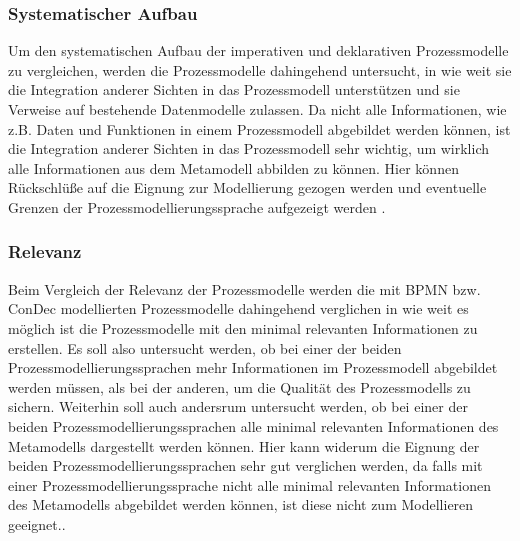 \subsubsection{Systematischer Aufbau}
Um den systematischen Aufbau der imperativen und deklarativen Prozessmodelle zu vergleichen, werden die Prozessmodelle dahingehend untersucht, in wie weit sie die Integration anderer Sichten in das Prozessmodell unterstützen und sie Verweise auf bestehende Datenmodelle zulassen. Da nicht alle Informationen, wie z.B. Daten und Funktionen in einem Prozessmodell abgebildet werden können, ist die Integration anderer Sichten in das Prozessmodell sehr wichtig, um wirklich alle Informationen aus dem Metamodell abbilden zu können. Hier können Rückschlüße auf die Eignung zur Modellierung gezogen werden und eventuelle Grenzen der Prozessmodellierungssprache aufgezeigt werden \cite{journals95, freund2007, becker2012prozessmanagement,koch2011}.

\subsubsection{Relevanz}
Beim Vergleich der Relevanz der Prozessmodelle werden die mit BPMN bzw. ConDec modellierten Prozessmodelle dahingehend verglichen in wie weit es möglich ist die Prozessmodelle mit den minimal relevanten Informationen zu erstellen. Es soll also untersucht werden, ob bei einer der beiden Prozessmodellierungssprachen mehr Informationen im Prozessmodell abgebildet werden müssen, als bei der anderen, um die Qualität des Prozessmodells zu sichern. Weiterhin soll auch andersrum untersucht werden, ob bei einer der beiden Prozessmodellierungssprachen alle minimal relevanten Informationen des Metamodells dargestellt werden können. Hier kann widerum die Eignung der beiden Prozessmodellierungssprachen sehr gut verglichen werden, da falls mit einer Prozessmodellierungssprache nicht alle minimal relevanten Informationen des Metamodells abgebildet werden können, ist diese nicht zum Modellieren geeignet.\cite{journals95, freund2007,reinshagen2009}. 

